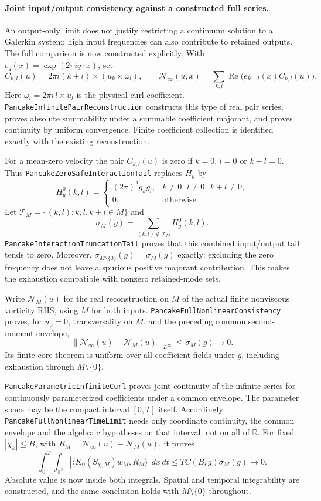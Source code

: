 \documentclass[11pt]{article}
\theoremstyle{definition}
\begin{document}
\paragraph{Joint input/output consistency against a constructed full series.}
An output-only limit does not justify restricting a continuum solution
to a Galerkin system: high input frequencies can also contribute to
retained outputs. The full comparison is now constructed explicitly.
With $e_q(x)=\exp(2\pi i q\cdot x)$, set
\[
 C_{k,l}(u)=2\pi i(k+l)\times(u_k\times\omega_l),\qquad
 \mathcal N_\infty(u,x)=\sum_{k,l}\operatorname{Re}
       \bigl(e_{k+l}(x)C_{k,l}(u)\bigr).
\]
Here $\omega_l=2\pi i\,l\times u_l$ is the physical curl coefficient.
\texttt{PancakeInfinitePairReconstruction} constructs this type of real
pair series, proves absolute summability under a summable coefficient
majorant, and proves continuity by uniform convergence. Finite coefficient
collection is identified exactly with the existing reconstruction.

For a mean-zero velocity the pair $C_{k,l}(u)$ is zero if $k=0$, $l=0$
or $k+l=0$. Thus \texttt{PancakeZeroSafeInteractionTail} replaces $H_g$ by
\[
 H_g^0(k,l)=
 \begin{cases}
 (2\pi)^2g_kg_l,& k\ne0,\ l\ne0,\ k+l\ne0,\\
 0,&\text{otherwise}.
 \end{cases}
\]
Let $\mathcal T_M=\{(k,l):k,l,k+l\in M\}$ and
\[
 \sigma_M(g)=\sum_{(k,l)\notin\mathcal T_M}H_g^0(k,l).
\]
\texttt{PancakeInteractionTruncationTail} proves that this combined
input/output tail tends to zero. Moreover,
$\sigma_{M\setminus\{0\}}(g)=\sigma_M(g)$ exactly: excluding the zero
frequency does not leave a spurious positive majorant contribution.
This makes the exhaustion compatible with nonzero retained-mode sets.

Write $\mathcal N_M(u)$ for the real reconstruction on $M$ of the
actual finite nonviscous vorticity RHS, using $M$ for both inputs.
\texttt{PancakeFullNonlinearConsistency} proves, for $u_0=0$,
transversality on $M$, and the preceding common second-moment envelope,
\[
 \|\mathcal N_\infty(u)-\mathcal N_M(u)\|_{L^\infty}
 \le\sigma_M(g)\longrightarrow0.
\]
Its finite-core theorem is uniform over all coefficient fields under $g$,
including exhaustion through $M\setminus\{0\}$.

\texttt{PancakeParametricInfiniteCurl} proves joint continuity of the
infinite series for continuously parameterized coefficients under a common
envelope. The parameter space may be the compact interval $[0,T]$ itself.
Accordingly \texttt{PancakeFullNonlinearTimeLimit} needs only coordinate
continuity, the common envelope and the algebraic hypotheses on that
interval, not on all of $\mathbb R$. For fixed $|\chi_k|\le B$, with
$R_M=\mathcal N_\infty(u)-\mathcal N_M(u)$, it proves
\[
 \boxed{\quad
 \int_0^T\int_{\mathbb T^3}
       |\langle K_0(S_{\chi,M})w_M,R_M\rangle|\,dx\,dt
 \le T C(B,g)\sigma_M(g)\longrightarrow0.
 \quad}
\]
Absolute value is now inside both integrals. Spatial and temporal
integrability are constructed, and the same conclusion holds with
$M\setminus\{0\}$ throughout.
\end{document}
